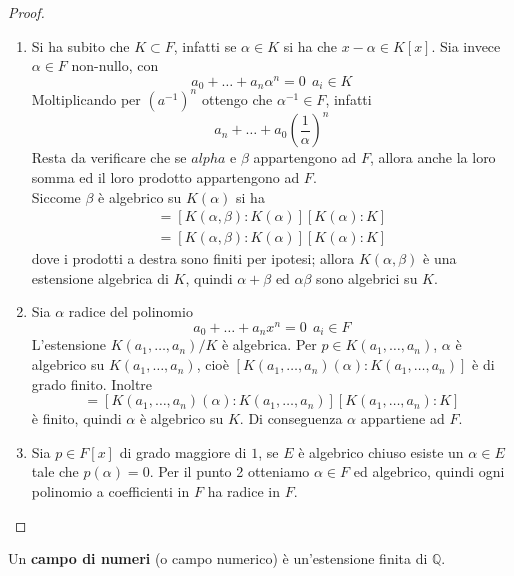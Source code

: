 \begin{proof}\
	\begin{enumerate}
		\item Si ha subito che $K \subset F$, infatti se $\alpha\in K$ si ha che $x-\alpha \in K[x]$. Sia invece $\alpha\in F$ non-nullo, con
		\begin{equation*}
		a_0+\dots+a_n\alpha^n = 0 \ \ a_i \in K
		\end{equation*}
		Moltiplicando per $(a^{-1})^n$ ottengo che $\alpha^{-1}\in F$, infatti
		\begin{equation*}
		a_n+\dots+a_0\left(\frac{1}{\alpha}\right)^n
		\end{equation*}
		Resta da verificare che se $alpha$ e $\beta$ appartengono ad $F$, allora anche la loro somma ed il loro prodotto appartengono ad $F$. \\ Siccome $\beta$ è algebrico su $K(\alpha)$ si ha 
		\begin{align*}
		[K(\alpha)(\beta):K(\alpha)]=[K(\alpha,\beta):K(\alpha)][K(\alpha):K]
		\end{align*}
		\begin{align*}
		[K(\alpha,\beta):K(\alpha)]=[K(\alpha,\beta):K(\alpha)][K(\alpha):K]
		\end{align*}
		dove i prodotti a destra sono finiti per ipotesi; allora $K(\alpha,\beta)$ è una estensione algebrica di $K$, quindi $\alpha+\beta$ ed $\alpha\beta$ sono algebrici su $K$.
		\item Sia $\alpha$ radice del polinomio
		\begin{equation*}
		a_0+\dots+a_nx^n = 0 \ \ a_i \in F
		\end{equation*}
		L'estensione $K(a_1,\dots,a_n)/K$ è algebrica. Per $p\in K(a_1,\dots,a_n)$, $\alpha$ è algebrico su $K(a_1,\dots,a_n)$, cioè $[K(a_1,\dots,a_n)(\alpha):K(a_1,\dots,a_n)]$ è di grado finito. Inoltre
		\begin{equation*}
		[K(a_1,\dots,a_n)(\alpha):K]=[K(a_1,\dots,a_n)(\alpha):K(a_1,\dots,a_n)][K(a_1,\dots,a_n):K]
		\end{equation*}
		è finito, quindi $\alpha$ è algebrico su $K$. Di conseguenza $\alpha$ appartiene ad $F$.
		\item Sia $p\in F[x]$ di grado maggiore di $1$, se $E$ è algebrico chiuso esiste un $\alpha\in E$ tale che $p(\alpha)=0$. Per il punto 2 otteniamo $\alpha\in F$ ed algebrico, quindi ogni polinomio a coefficienti in $F$ ha radice in $F$.
	\end{enumerate}
\end{proof}
\begin{definizione}
	Un \textbf{campo di numeri} (o campo numerico) è un'estensione finita di $\mathbb{Q}$.
\end{definizione}





